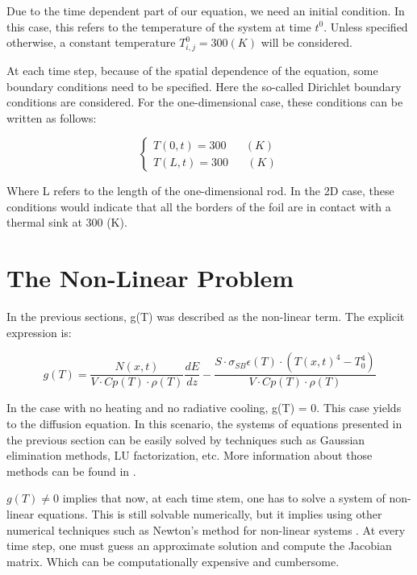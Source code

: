 Due to the time dependent part of our equation, we need an initial condition. In this case, this refers to the temperature of the system at time $t^0$. Unless specified otherwise, a constant temperature $T_{i,j}^0 = 300 (K)$ will be considered.

At each time step, because of the spatial dependence of the equation, some boundary conditions need to be specified. Here the so-called Dirichlet boundary conditions are considered. For the one-dimensional case, these conditions can be written as follows: 

\begin{equation}
    \begin{cases}
      T(0,t) = 300 \mspace{30mu} (K) \\
      T(L,t) = 300 \mspace{30mu} (K) 
    \end{cases}
\end{equation}

Where L refers to the length of the one-dimensional rod. In the 2D case, these conditions would indicate that all the borders of the foil are in contact with a thermal sink at 300 (K). 

\section{The Non-Linear Problem}

In the previous sections, g(T) was described as the non-linear term. The explicit expression is: 

\begin{equation}
    g(T) = \frac{N(x,t)}{V\cdot Cp(T)\cdot \rho(T)}\frac{dE}{dz} - \frac{S\cdot \sigma_{SB}\epsilon(T)\cdot \left( T(x,t)^4 - T_0^4\right)}{V\cdot Cp(T)\cdot \rho(T)}
\end{equation}

In the case with no heating and no radiative cooling, g(T) = 0. This case yields to the diffusion equation. In this scenario, the systems of equations presented in the previous section can be easily solved by techniques such as Gaussian elimination methods, LU factorization, etc. More information about those methods can be found in \parencite[][]{ref:AlvaroBook}. 

$g(T) \neq 0$ implies that now, at each time stem, one has to solve a system of non-linear equations. This is still solvable numerically, but it implies using other numerical techniques such as Newton's method for non-linear systems \parencite[][]{ref:AlvaroBook}. At every time step, one must guess an approximate solution and compute the Jacobian matrix. Which can be computationally expensive and cumbersome. 

